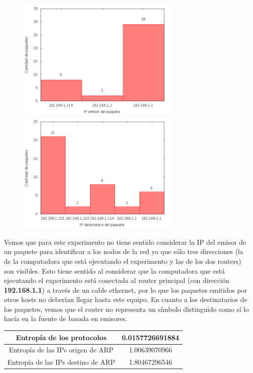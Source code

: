 \begin{figure}[!h]
\centering
\begin{minipage}{8cm}
  \centering
  \includegraphics[width=8cm]{../mediciones/home-eth-10/home-eth-10IpsSrcArp.png}
\end{minipage}%
\begin{minipage}{8cm}
  \centering
  \includegraphics[width=8cm]{../mediciones/home-eth-10/home-eth-10IpsDstArp.png}
\end{minipage}
\end{figure}

Vemos que para este experimento no tiene sentido considerar la IP del emisor de un paquete para identificar a los nodos de la red ya que sólo tres direcciones
(la de la computadora que está ejecutando el experimento y las de los dos routers) son visibles. Esto tiene sentido al considerar que la computadora que
está ejecutando el experimento está conectada al router principal (con dirección \textbf{192.168.1.1}) a través de un cable ethernet, por lo que los paquetes emitidos
por otros hosts no deberían llegar hasta este equipo. En cuanto a los destinatarios de los paquetes, vemos que el router no representa un símbolo distinguido
como sí lo hacía en la fuente de basada en emisores.

\begin{center}
\begin{tabular}{|c||c|}
\hline
Entropía de los protocolos & 0.0157726691884  \\
\hline
Entropía de las IPs origen de ARP & 1.00639070966  \\
\hline
Entropía de las IPs destino de ARP & 1.80467296546 \\
\hline
\end{tabular}
\end{center}


